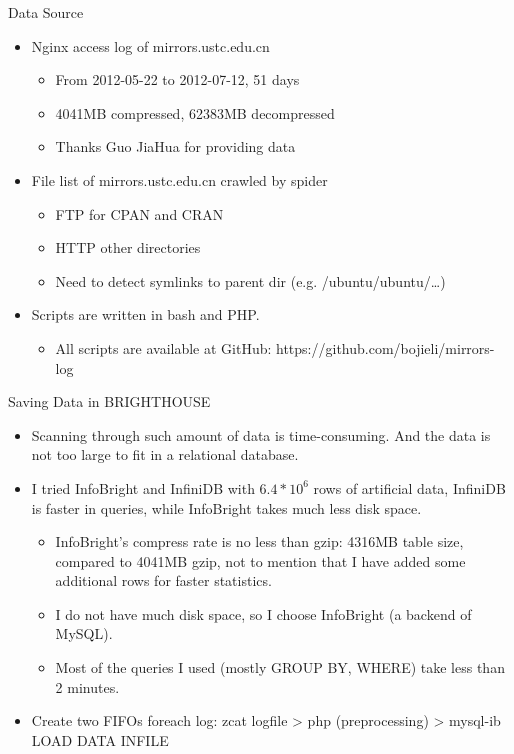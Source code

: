 \documentclass{beamer}
\begin{document}
\begin{frame}{Data Source}
\begin{itemize}
  \item Nginx access log of mirrors.ustc.edu.cn 
  \begin{itemize}
    \item From 2012-05-22 to 2012-07-12, 51 days
    \item 4041MB compressed, 62383MB decompressed
    \item Thanks Guo JiaHua for providing data
  \end{itemize}
  \item File list of mirrors.ustc.edu.cn crawled by spider
  \begin{itemize}
    \item FTP for CPAN and CRAN
    \item HTTP other directories
    \item Need to detect symlinks to parent dir (e.g. /ubuntu/ubuntu/\ldots)
  \end{itemize}
  \item Scripts are written in bash and PHP.
  \begin{itemize}
    \item All scripts are available at GitHub: https://github.com/bojieli/mirrors-log
  \end{itemize}
\end{itemize}
\end{frame}

\begin{frame}{Saving Data in BRIGHTHOUSE}
\begin{itemize}
  \item Scanning through such amount of data is time-consuming. And the data is not too large to fit in a relational database.
  \item I tried InfoBright and InfiniDB with $6.4*10^6$ rows of artificial data, InfiniDB is faster in queries, while InfoBright takes much less disk space.
  \begin{itemize}
    \item InfoBright's compress rate is no less than gzip: 4316MB table size, compared to 4041MB gzip, not to mention that I have added some additional rows for faster statistics.
    \item I do not have much disk space, so I choose InfoBright (a backend of MySQL).
    \item Most of the queries I used (mostly GROUP BY, WHERE) take less than 2 minutes.
  \end{itemize}
  \item Create two FIFOs foreach log: zcat logfile > php (preprocessing) > mysql-ib LOAD DATA INFILE
\end{itemize}
\end{frame}
\end{document}
